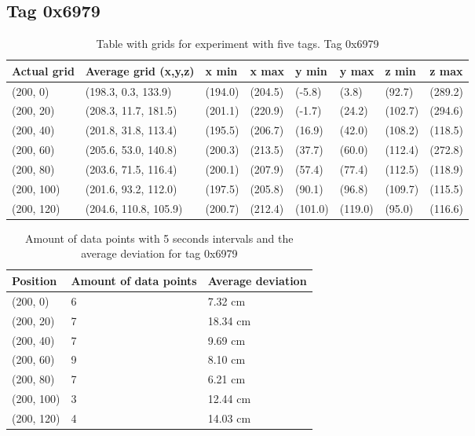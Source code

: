 \subsection{Tag 0x6979}
\begin{table}[H]
    \centering
    \begin{tabular}{|l|l|l|l|l|l|l|l|}
        \hline
        Actual grid & Average grid (x,y,z)  & x min   & x max   & y min   & y max   & z min   & z max   \\ \hline
        (200, 0)    & (198.3, 0.3, 133.9)   & (194.0) & (204.5) & (-5.8)  & (3.8)   & (92.7)  & (289.2) \\ \hline
        (200, 20)   & (208.3, 11.7, 181.5)  & (201.1) & (220.9) & (-1.7)  & (24.2)  & (102.7) & (294.6) \\ \hline
        (200, 40)   & (201.8, 31.8, 113.4)  & (195.5) & (206.7) & (16.9)  & (42.0)  & (108.2) & (118.5) \\ \hline
        (200, 60)   & (205.6, 53.0, 140.8)  & (200.3) & (213.5) & (37.7)  & (60.0)  & (112.4) & (272.8) \\ \hline
        (200, 80)   & (203.6, 71.5, 116.4)  & (200.1) & (207.9) & (57.4)  & (77.4)  & (112.5) & (118.9) \\ \hline
        (200, 100)  & (201.6, 93.2, 112.0)  & (197.5) & (205.8) & (90.1)  & (96.8)  & (109.7) & (115.5) \\ \hline
        (200, 120)  & (204.6, 110.8, 105.9) & (200.7) & (212.4) & (101.0) & (119.0) & (95.0)  & (116.6) \\ \hline
    \end{tabular}
    \caption{Table with grids for experiment with five tags. Tag 0x6979}
\end{table}

\begin{table}[H]
    \centering
    \begin{tabular}{|l|l|l|}
        \hline
        Position   & Amount of data points & Average deviation \\ \hline
        (200, 0)   & 6                     & 7.32 cm           \\ \hline
        (200, 20)  & 7                     & 18.34 cm          \\ \hline
        (200, 40)  & 7                     & 9.69 cm           \\ \hline
        (200, 60)  & 9                     & 8.10 cm           \\ \hline
        (200, 80)  & 7                     & 6.21 cm           \\ \hline
        (200, 100) & 3                     & 12.44 cm          \\ \hline
        (200, 120) & 4                     & 14.03 cm          \\ \hline
    \end{tabular}
    \caption{Amount of data points with 5 seconds intervals and the average deviation for tag 0x6979}
\end{table}
